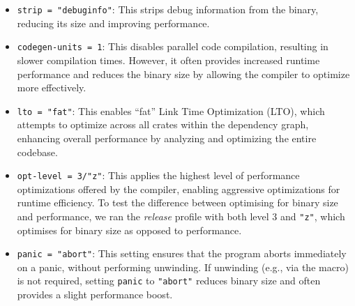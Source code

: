 \documentclass[11pt]{report}
\theoremstyle{definition}
\theoremstyle{plain}
\newcommand{\todo}[1]{{\color[rgb]{.5,0,0}\textbf{$\blacktriangleright$#1$\blacktriangleleft$}}}
\begin{document}
\begin{itemize}
  \item \texttt{strip = "debuginfo"}: This strips debug information from the binary, reducing its size and improving performance.

  \item \texttt{codegen-units = 1}: This disables parallel code compilation, resulting in slower compilation times. However, it often provides increased runtime performance and reduces the binary size by allowing the compiler to optimize more effectively.

  \item \texttt{lto = "fat"}: This enables ``fat'' Link Time Optimization (LTO), which attempts to optimize across all crates within the dependency graph, enhancing overall performance by analyzing and optimizing the entire codebase.

  \item \texttt{opt-level = 3/"z"}: This applies the highest level of performance optimizations offered by the compiler, enabling aggressive optimizations for runtime efficiency. To test the difference between optimising for binary size and performance, we ran the \textit{release} profile with both level 3 and \texttt{"z"}, which optimises for binary size as opposed to performance.

  \item \texttt{panic = "abort"}: This setting ensures that the program aborts immediately on a panic, without performing unwinding. If unwinding (e.g., via the  macro) is not required, setting \texttt{panic} to \texttt{"abort"} reduces binary size and often provides a slight performance boost.
\end{itemize}

\end{document}
